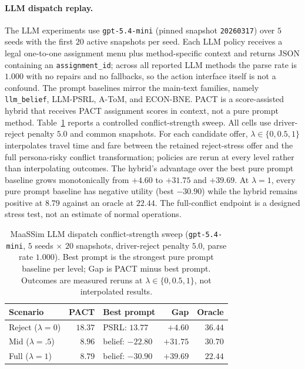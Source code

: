 \paragraph{LLM dispatch replay.}
The LLM experiments use \texttt{gpt-5.4-mini} (pinned snapshot \texttt{20260317}) over $5$ seeds with the first $20$ active snapshots per seed. Each LLM policy receives a legal one-to-one assignment menu plus method-specific context and returns JSON containing an \texttt{assignment\_id}; across all reported LLM methods the parse rate is $1.000$ with no repairs and no fallbacks, so the action interface itself is not a confound. The prompt baselines mirror the main-text families, namely \texttt{llm\_belief}, LLM-PSRL, A-ToM, and ECON-BNE. PACT is a score-assisted hybrid that receives PACT assignment scores in context, not a pure prompt method. Table~\ref{tab:maassim-scenarios} reports a controlled conflict-strength sweep. All cells use driver-reject penalty $5.0$ and common snapshots. For each candidate offer, $\lambda\in\{0,0.5,1\}$ interpolates travel time and fare between the retained reject-stress offer and the full persona-risky conflict transformation; policies are rerun at every level rather than interpolating outcomes. The hybrid's advantage over the best pure prompt baseline grows monotonically from $+4.60$ to $+31.75$ and $+39.69$. At $\lambda=1$, every pure prompt baseline has negative utility (best $-30.90$) while the hybrid remains positive at $8.79$ against an oracle at $22.44$. The full-conflict endpoint is a designed stress test, not an estimate of normal operations.

\begin{table}[t]
\centering
\scriptsize
\setlength{\tabcolsep}{3pt}
\begin{tabular}{@{}lrlrr@{}}
\toprule
Scenario & PACT & Best prompt & Gap & Oracle \\
\midrule
Reject ($\lambda=0$) & $18.37$ & PSRL: $13.77$ & $+4.60$ & $36.44$ \\
Mid ($\lambda=.5$) & $8.96$ & belief: $-22.80$ & $+31.75$ & $30.70$ \\
Full ($\lambda=1$) & $\mathbf{8.79}$ & belief: $-30.90$ & $+39.69$ & $22.44$ \\
\bottomrule
\end{tabular}
\caption{MaaSSim LLM dispatch conflict-strength sweep (\texttt{gpt-5.4-mini}, $5$ seeds $\times$ $20$ snapshots, driver-reject penalty $5.0$, parse rate $1.000$). Best prompt is the strongest pure prompt baseline per level; Gap is PACT minus best prompt. Outcomes are measured reruns at $\lambda\in\{0,0.5,1\}$, not interpolated results.}
\label{tab:maassim-scenarios}
\end{table}

